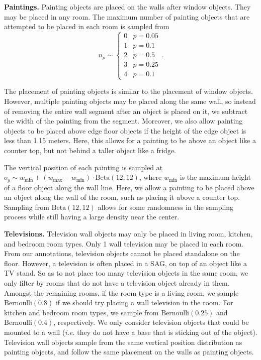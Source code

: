\textbf{Paintings.} Painting objects are placed on the walls after window objects. They may be placed in any room. The maximum number of painting objects that are attempted to be placed in each room is sampled from
\begin{equation}
    n_p\sim\begin{cases}
        0 & p=0.05\\
        1 & p=0.1\\
        2 & p=0.5\\
        3 & p=0.25\\
        4 & p=0.1
    \end{cases}.
\end{equation}

The placement of painting objects is similar to the placement of window objects. However, multiple painting objects may be placed along the same wall, so instead of removing the entire wall segment after an object is placed on it, we subtract the width of the painting from the segment. Moreover, we also allow painting objects to be placed above edge floor objects if the height of the edge object is less than 1.15 meters. Here, this allows for a painting to be above an object like a counter top, but not behind a taller object like a fridge.

The vertical position of each painting is sampled at $o_y\sim w_{\min} + (w_{\max} - w_{\min})\cdot \text{Beta}(12, 12)$, where $w_{\min}$ is the maximum height of a floor object along the wall line. Here, we allow a painting to be placed above an object along the wall of the room, such as placing it above a counter top. Sampling from $\text{Beta}(12, 12)$ allows for some randomness in the sampling process while still having a large density near the center.

\textbf{Televisions.} Television wall objects may only be placed in living room, kitchen, and bedroom room types. Only 1 wall television may be placed in each room. From our annotations, television objects cannot be placed standalone on the floor. However, a television is often placed in a SAG, on top of an object like a TV stand. So as to not place too many television objects in the same room, we only filter by rooms that do not have a television object already in them. Amongst the remaining rooms, if the room type is a living room, we sample $\text{Bernoulli}(0.8)$ if we should try placing a wall television in the room. For kitchen and bedroom room types, we sample from $\text{Bernoulli}(0.25)$ and $\text{Bernoulli}(0.4)$, respectively. We only consider television objects that could be mounted to a wall (\textit{i.e.} they do not have a base that is sticking out of the object). Television wall objects sample from the same vertical position distribution as painting objects, and follow the same placement on the walls as painting objects.

